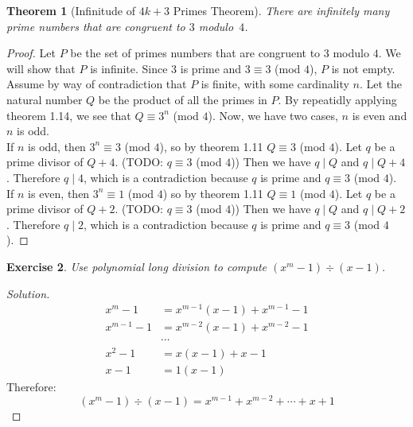 \documentclass[12pt,leqno]{article}
\numberwithin{equation}{section}
\newtheorem{thm}{Theorem}[section]
\newtheorem{exer}[thm]{Exercise}
\theoremstyle{definition}
\newcommand{\modulo}[3]{$#1 \equiv #2$ (mod $#3$)}
\begin{document}
\begin{thm}[Infinitude of $4k + 3$ Primes Theorem]
There are infinitely many prime numbers that are congruent to $3$
modulo~$4$.
\end{thm}

\begin{proof}[Proof]
Let $P$ be the set of primes numbers that are congruent to $3$ modulo $4$.  We will show that $P$ is infinite.  Since $3$ is prime and \modulo{3}{3}{4}, $P$ is not empty.  Assume by way of contradiction that $P$ is finite, with some cardinality $n$.  Let the natural number $Q$ be the product of all the primes in $P$.  By repeatidly applying theorem 1.14, we see that \modulo{Q}{3^n}{4}.  Now, we have two cases, $n$ is even and $n$ is odd.\\  If $n$ is odd, then \modulo{3^n}{3}{4}, so by theorem 1.11 \modulo{Q}{3}{4}.  Let $q$ be a prime divisor of  $Q + 4$. (TODO: \modulo{q}{3}{4}) Then we have $q \mid Q$ and $q \mid Q+4$.  Therefore $q \mid 4$, which is a contradiction because $q$ is prime and \modulo{q}{3}{4}.\\
If $n$ is even, then \modulo{3^n}{1}{4} so by theorem 1.11 \modulo{Q}{1}{4}.  Let $q$ be a prime divisor of  $Q + 2$. (TODO: \modulo{q}{3}{4}) Then we have $q \mid Q$ and $q \mid Q+2$.  Therefore $q \mid 2$, which is a contradiction because $q$ is prime and \modulo{q}{3}{4}.
\end{proof}


\setcounter{thm}{40}
\pagebreak

\begin{exer}
Use  polynomial long division to compute $(x^m-1) \div (x-1)$.
\end{exer}

\begin{proof}[Solution]
\begin{align*}
x^m - 1 &= x^{m-1}(x-1) + x^{m-1} - 1\\
x^{m-1} - 1 &= x^{m-2}(x-1) + x^{m-2} - 1\\
&\cdots \\
x^2 - 1 &= x(x-1) + x - 1\\
x - 1 &= 1(x-1)
\end{align*}
Therefore:
\[(x^m-1) \div (x-1) = x^{m-1} + x^{m-2} + \cdots + x + 1\]
\end{proof}
\end{document}
